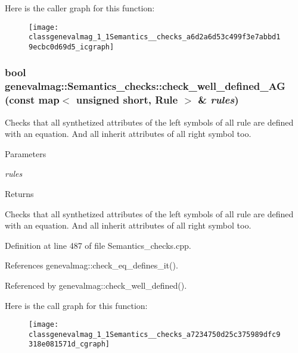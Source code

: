 Here is the caller graph for this function:\nopagebreak
\begin{figure}[H]
\begin{center}
\leavevmode
\texttt{[image: classgenevalmag\_1\_1Semantics\_\_checks\_a6d2a6d53c499f3e7abbd19ecbc0d69d5\_icgraph]}
\end{center}
\end{figure}


\hypertarget{classgenevalmag_1_1Semantics__checks_a7234750d25c375989dfc9318e081571d}{
\subsubsection[{check\_\-well\_\-defined\_\-AG}]{\setlength{\rightskip}{0pt plus 5cm}bool genevalmag::Semantics\_\-checks::check\_\-well\_\-defined\_\-AG (const map$<$ unsigned short, {\bf Rule} $>$ \& {\em rules})}}
\label{classgenevalmag_1_1Semantics__checks_a7234750d25c375989dfc9318e081571d}
Checks that all synthetized attributes of the left symbols of all rule are defined with an equation. And all inherit attributes of all right symbol too.


\begin{DoxyParams}{Parameters}
\item[{\em rules}]\end{DoxyParams}
\begin{DoxyReturn}{Returns}

\end{DoxyReturn}
Checks that all synthetized attributes of the left symbols of all rule are defined with an equation. And all inherit attributes of all right symbol too. 

Definition at line 487 of file Semantics\_\-checks.cpp.



References genevalmag::check\_\-eq\_\-defines\_\-it().



Referenced by genevalmag::check\_\-well\_\-defined().



Here is the call graph for this function:\nopagebreak
\begin{figure}[H]
\begin{center}
\leavevmode
\texttt{[image: classgenevalmag\_1\_1Semantics\_\_checks\_a7234750d25c375989dfc9318e081571d\_cgraph]}
\end{center}
\end{figure}




